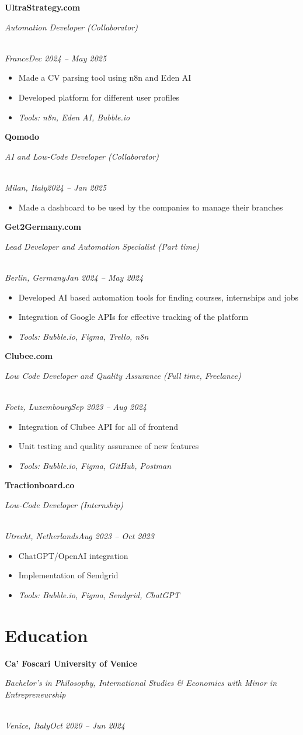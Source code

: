 \documentclass[a4paper,10pt]{article}
\newcommand{\role}[4]{\vspace{3pt}\noindent\hspace{0.6em}\parbox[t]{0.38\textwidth}{\raggedright\textbf{#1}}\hfill\parbox[t]{0.58\textwidth}{\raggedleft\textit{#2}}\\{\textit{#3}\hfill\textit{#4}}\vspace{1pt}}
\begin{document}
\role{UltraStrategy.com}{Automation Developer (Collaborator)}{France}{Dec 2024 -- May 2025}
\begin{itemize}
\item Made a CV parsing tool using n8n and Eden AI
\item Developed platform for different user profiles
\item \textit{Tools: n8n, Eden AI, Bubble.io}
\end{itemize}

\role{Qomodo}{AI and Low-Code Developer (Collaborator)}{Milan, Italy}{2024 -- Jan 2025}
\begin{itemize}
\item Made a dashboard to be used by the companies to manage their branches
\end{itemize}

\role{Get2Germany.com}{Lead Developer and Automation Specialist (Part time)}{Berlin, Germany}{Jan 2024 -- May 2024}
\begin{itemize}
\item Developed AI based automation tools for finding courses, internships and jobs
\item Integration of Google APIs for effective tracking of the platform
\item \textit{Tools: Bubble.io, Figma, Trello, n8n}
\end{itemize}

\role{Clubee.com}{Low Code Developer and Quality Assurance (Full time, Freelance)}{Foetz, Luxembourg}{Sep 2023 -- Aug 2024}
\begin{itemize}
\item Integration of Clubee API for all of frontend
\item Unit testing and quality assurance of new features
\item \textit{Tools: Bubble.io, Figma, GitHub, Postman}
\end{itemize}

\role{Tractionboard.co}{Low-Code Developer (Internship)}{Utrecht, Netherlands}{Aug 2023 -- Oct 2023}
\begin{itemize}
\item ChatGPT/OpenAI integration
\item Implementation of Sendgrid
\item \textit{Tools: Bubble.io, Figma, Sendgrid, ChatGPT}
\end{itemize}

\section{Education}
\role{Ca' Foscari University of Venice}{Bachelor's in Philosophy, International Studies \& Economics with Minor in Entrepreneurship}{Venice, Italy}{Oct 2020 -- Jun 2024}
\end{document}

